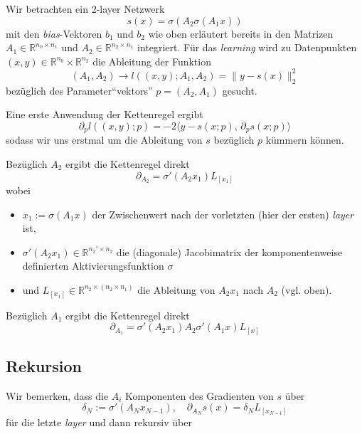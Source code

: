 \documentclass[
]{book}
\providecommand{\tightlist}{%
  \setlength{\itemsep}{0pt}\setlength{\parskip}{0pt}}
\theoremstyle{definition}
\theoremstyle{definition}
\theoremstyle{definition}
\theoremstyle{definition}
\theoremstyle{remark}
\begin{document}
Wir betrachten ein 2-layer Netzwerk
\begin{equation*}
s(x) = \sigma(A_2 \sigma(A_1x))
\end{equation*}
mit den \emph{bias}-Vektoren \(b_1\) und \(b_2\) wie oben erläutert bereits in den Matrizen \(A_1\in \mathbb R^{n_0\times n_1}\) und \(A_2 \in \mathbb R^{n_2\times n_1}\) integriert.
Für das \emph{learning} wird zu Datenpunkten \((x, y) \in \mathbb R^{n_0}\times \mathbb R^{n_2}\) die Ableitung der Funktion
\begin{equation*}
(A_1, A_2) \to l((x,y); A_1, A_2) = \|y-s(x)\|_2^2
\end{equation*}
bezüglich des Parameter``vektors'' \(p=(A_2, A_1)\) gesucht.

Eine erste Anwendung der Kettenregel ergibt
\begin{equation*}
\partial_p l((x,y); p) = -2\bigl \langle y-s(x;p), \, \partial_p s(x;p)\bigr\rangle 
\end{equation*}
sodass wir uns erstmal um die Ableitung von \(s\) bezüglich \(p\) kümmern
können.

Bezüglich \(A_2\) ergibt die Kettenregel direkt
\begin{equation*}
\partial_{A_2} = \sigma'(A_2x_1)L_{[x_1]}
\end{equation*}
wobei

\begin{itemize}
\tightlist
\item
  \(x_1:=\sigma(A_1x)\) der Zwischenwert nach der vorletzten (hier der ersten) \emph{layer} ist,
\item
  \(\sigma'(A_2x_1)\in \mathbb R^{n_2'\times n_2}\) die (diagonale) Jacobimatrix der komponentenweise definierten Aktivierungsfunktion \(\sigma\)
\item
  und \(L_{[x_1]}\in \mathbb R^{n_2\times (n_2\times n_1)}\) die Ableitung von \(A_2x_1\) nach \(A_2\) (vgl. oben).
\end{itemize}

Bezüglich \(A_1\) ergibt die Kettenregel direkt
\begin{equation*}
\partial_{A_1} = \sigma'(A_2x_1)A_2\sigma'(A_1x)L_{[x]}
\end{equation*}

\hypertarget{rekursion}{%
\subsection{Rekursion}\label{rekursion}}

Wir bemerken, dass die \(A_i\) Komponenten des Gradienten von \(s\) über
\begin{equation*}
\delta_N := \sigma'(A_Nx_{N-1}), \quad \partial_{A_N} s(x) = \delta_N L_{[x_{N-1}]}
\end{equation*}
für die letzte \emph{layer} und dann rekursiv über
\end{document}
